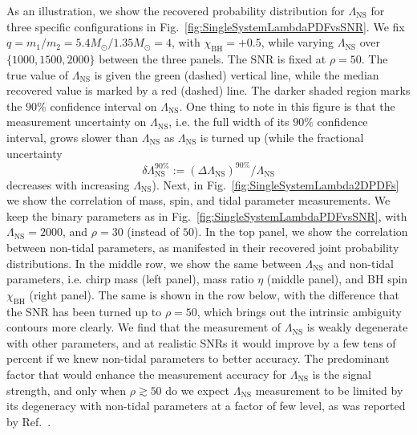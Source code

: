 \documentclass[aps,prd,amsmath,floats,floatfix, twocolumn,
superscriptaddress,nofootinbib,showpacs]{revtex4-1}
\newcommand{\lambdans}{\Lambda_\mathrm{NS}}
\newcommand{\chibh}{\chi_\mathrm{BH}}
\begin{document}
As an illustration, we show the recovered
probability distribution for $\lambdans$ for three specific configurations in 
Fig.~\ref{fig:SingleSystemLambdaPDFvsSNR}. We fix $q = m_1/m_2 =
5.4M_\odot/1.35M_\odot = 4$, with $\chibh=+0.5$, while varying $\lambdans$
over $\{1000, 1500, 2000\}$ between the three panels. The SNR is fixed at $\rho=50$.
The true value of $\lambdans$ is given the green (dashed) vertical line,
while the median recovered value is marked by a red (dashed) line. The darker
shaded region marks the $90\%$ confidence interval on $\lambdans$. One thing
to note in this figure is that the measurement uncertainty on $\lambdans$, i.e.
the full width of its $90\%$ confidence interval, grows slower than $\lambdans$
as $\lambdans$ is turned up (while the fractional uncertainty
\begin{equation}
\delta\lambdans^{90\%}:= (\Delta\lambdans)^{90\%}/\lambdans
\end{equation}
decreases with increasing $\lambdans$).
%
Next, in Fig.~\ref{fig:SingleSystemLambda2DPDFs} we show the correlation of
mass, spin, and tidal parameter measurements. We keep the binary parameters
as in Fig.~\ref{fig:SingleSystemLambdaPDFvsSNR}, with $\lambdans=2000$, and
$\rho=30$ (instead of $50$). In the top panel, we show the correlation between
non-tidal parameters, as manifested in their recovered joint probability
distributions.
In the middle row, we show the same between $\lambdans$ and non-tidal 
parameters, i.e. chirp mass (left panel), mass ratio $\eta$ (middle panel), and
BH spin $\chibh$ (right panel). The same is shown in the row below, with the
difference that the SNR has been turned up to $\rho=50$, which brings out the
intrinsic ambiguity contours more clearly.
%
We find that the measurement of $\lambdans$ is weakly degenerate with
other parameters, and at realistic SNRs it would improve by a few tens of 
percent if we knew non-tidal parameters to better accuracy. The predominant
factor that would enhance the measurement accuracy for $\lambdans$ is the
signal strength, and only when $\rho\gtrsim 50$ do we expect $\lambdans$ 
measurement to be limited by its degeneracy with non-tidal parameters at 
a factor of few level, as was reported by Ref.~\cite{Lackey:2013axa}.
\end{document}
